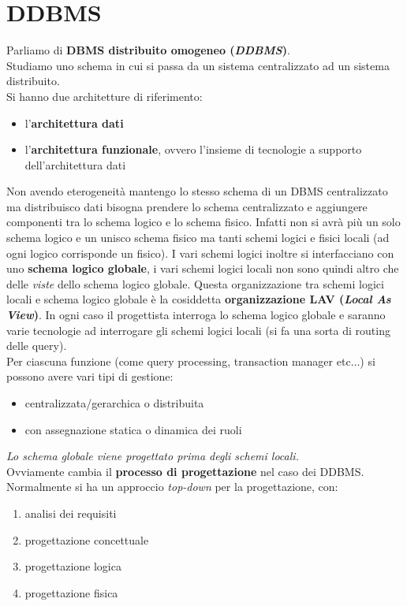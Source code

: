 \documentclass[a4paper,12pt, oneside]{book}
\begin{document}
\section{DDBMS}
Parliamo di \textbf{DBMS distribuito omogeneo (\textit{DDBMS})}.\\
Studiamo uno schema in cui si passa da un sistema centralizzato ad un sistema
distribuito.\\
Si hanno due architetture di riferimento:
\begin{itemize}
  \item l'\textbf{architettura dati}
  \item l'\textbf{architettura funzionale}, ovvero l'insieme di tecnologie a
  supporto dell'architettura dati
\end{itemize}
Non avendo eterogeneità mantengo lo stesso schema di un DBMS centralizzato ma
distribuisco dati bisogna prendere lo schema centralizzato e aggiungere
componenti tra lo schema logico e lo schema fisico. Infatti non si avrà più un
solo schema logico e un unisco schema fisico ma tanti schemi logici e fisici
locali (ad ogni logico corrisponde un fisico). I vari schemi logici inoltre si
interfacciano con uno \textbf{schema logico globale}, i vari schemi logici
locali non sono quindi altro che delle \textit{viste} dello schema logico
globale. Questa organizzazione tra schemi logici locali e schema logico globale
è la cosiddetta \textbf{organizzazione LAV (\textit{Local As View})}. In ogni
caso il progettista interroga lo schema logico globale e saranno varie
tecnologie ad interrogare gli schemi logici locali (si fa una sorta di routing
delle query).\\
Per ciascuna funzione (come query processing, transaction manager etc$\ldots$)
si possono avere vari tipi di gestione:
\begin{itemize}
  \item centralizzata/gerarchica o distribuita
  \item con assegnazione statica o dinamica dei ruoli
\end{itemize}
\textit{Lo schema globale viene progettato prima degli schemi locali.}\\
Ovviamente cambia il \textbf{processo di progettazione} nel caso dei
DDBMS. Normalmente si ha un approccio \textit{top-down} per la progettazione,
con:
\begin{enumerate}
  \item analisi dei requisiti
  \item progettazione concettuale
  \item progettazione logica
  \item progettazione fisica
\end{enumerate}
\end{document}
